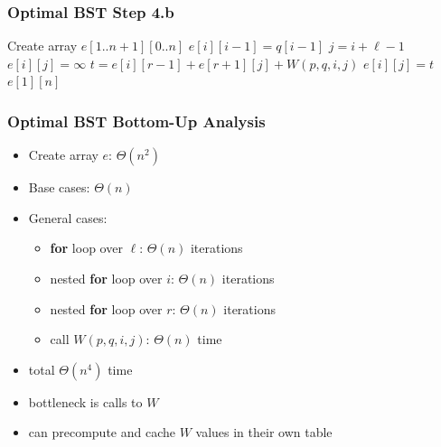 \documentclass[10pt,aspectratio=169]{beamer}
\begin{document}
  \begin{frame} \frametitle{Optimal BST Step 4.b}
    {\footnotesize
    \begin{algorithmic}[1]
      \State Create array $e[1..n+1][0..n]$ 
        \State $e[i][i-1] = q[i-1]$ 
      \EndFor
          \State $j = i + \ell - 1$
          \State $e[i][j] = \infty$
            \State $t = e[i][r-1] + e[r+1][j] + W(p, q, i, j)$
              \State $e[i][j] = t$
            \EndIf
          \EndFor
        \EndFor
      \EndFor
      \State \Return $e[1][n]$
      \EndFunction
    \end{algorithmic}
    }
\end{frame}
  
\begin{frame} \frametitle{Optimal BST Bottom-Up Analysis}
  \begin{itemize}
    \item Create array $e$: $\Theta(n^2)$
    \item Base cases: $\Theta(n)$
    \item General cases:
      \begin{itemize}
        \item \textbf{for} loop over $\ell$: $\Theta(n)$ iterations
        \item nested \textbf{for} loop over $i$: $\Theta(n)$ iterations
        \item nested \textbf{for} loop over $r$: $\Theta(n)$ iterations
        \item call $W(p, q, i, j)$: $\Theta(n)$ time
      \end{itemize}
    \item total $\Theta(n^4)$ time
    \item bottleneck is calls to $W$
    \item can precompute and cache $W$ values in their own table
  \end{itemize}
\end{frame}
\end{document}
